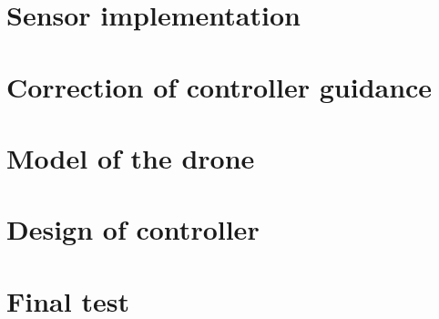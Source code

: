 \chapter{Sensor implementation}\label{ch:sensor}
    
    
\chapter{Correction of controller guidance}\label{ch:controller_implementation}
    
\chapter{Model of the drone}\label{ch:model_drone}
    
\chapter{Design of controller}
    
    
\chapter{Final test}
    
%
%

%         
%         
%         

%
\printbibliography[heading=bibintoc]
\label{bib:mybiblio}
\appendix
%



